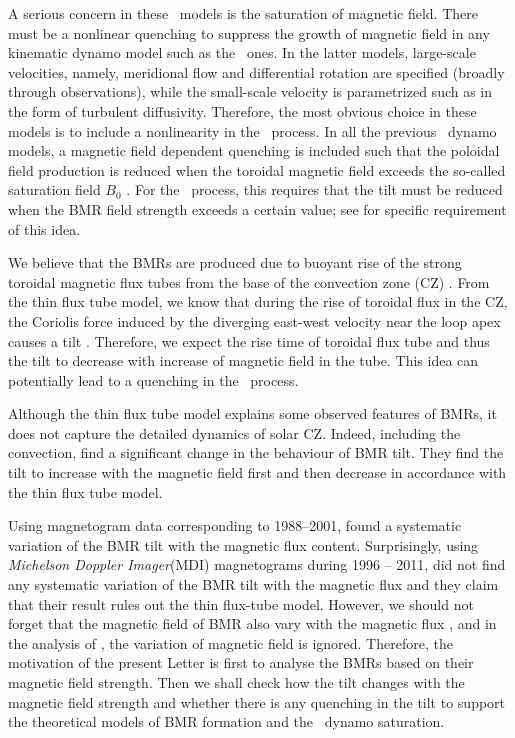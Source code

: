 A serious concern in these \bl\ models is the saturation of magnetic field. There
must be a nonlinear quenching to suppress the growth of magnetic field in any kinematic dynamo model such as the \bl\ ones.
In the latter models, large-scale velocities, namely, meridional flow and differential rotation are specified (broadly through observations), while the small-scale velocity is parametrized such as in the form of turbulent diffusivity. 
Therefore, the most obvious choice in these models is to include a nonlinearity in the \bl\ process. 
In all the previous \bl\ dynamo models, a magnetic field dependent quenching is included such that the poloidal field production is reduced when the toroidal magnetic field exceeds the so-called saturation field $B_0$ \citep{Charbonneau2010}. For the \bl\ process, this requires that the tilt must be reduced when the BMR field strength
exceeds a certain value; see \citet{Lemerle2017, Karak2017, Karak2018} for specific requirement of this idea. 

We believe that the BMRs are produced due to buoyant rise of the strong toroidal magnetic flux tubes from the base of the convection zone (CZ) \citep{Parker1955a}.  From the thin flux tube model, we know that during the rise of toroidal flux in the CZ, 
the Coriolis force induced by the diverging east-west velocity near the loop apex causes a tilt \citep{DSilva1993, Fan1994}.
Therefore, we expect the rise time of toroidal flux tube and thus the tilt to decrease with increase of magnetic field in the tube. 
This idea can potentially lead to a quenching in the \bl\ process. 

Although the thin flux tube model explains some observed features of BMRs, it does not capture the detailed dynamics of solar CZ. Indeed,
including the convection, \citet{Weber2011} find a significant change in the
behaviour of BMR tilt. They find the tilt to increase with the magnetic field first and then decrease in accordance with the thin flux tube model.


Using magnetogram data corresponding to 1988--2001, 
\citet{Tian2003} found a systematic variation of the BMR tilt 
with the magnetic flux content. Surprisingly,
using {\it Michelson Doppler Imager}(MDI) magnetograms during 1996 -- 2011, \citet{Stenflo2012a} did not
find any systematic variation of the BMR tilt with the magnetic flux
and they claim that their result rules out the thin flux-tube model.
However, we should not forget that the magnetic field of BMR 
also vary with the magnetic flux \citep{Tlatov2014},
and in the analysis of \citet{Stenflo2012a}, the variation of magnetic field is ignored.
Therefore, the motivation of the present Letter is first to analyse the BMRs 
based on their magnetic field strength. 
Then we shall check how the tilt changes with the magnetic field strength
and whether there is any quenching in the tilt to support the theoretical models of 
BMR formation and the \bl\ dynamo saturation.


